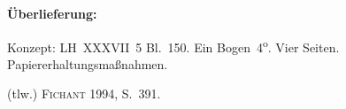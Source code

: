 %  
%
%
%
%
%
\frenchspacing
%
\begin{ledgroupsized}[r]{120mm}
\footnotesize
\pstart
\noindent\textbf{Überlieferung:}
\pend
\end{ledgroupsized}
%
\begin{ledgroupsized}[r]{114mm}
\footnotesize
\pstart \parindent -6mm
Konzept: LH~XXXVII~5 Bl.~150.
Ein Bogen~4\textsuperscript{o}.
Vier Seiten. 
Papiererhaltungsmaßnahmen.
\pend
\end{ledgroupsized}
%
\begin{ledgroupsized}[r]{114mm}
\footnotesize
\pstart
\parindent -6mm 
(tlw.) \textsc{Fichant} 1994, S.~391\cite{01056}.
\pend%
\end{ledgroupsized}
%
%
\vspace{5mm}
